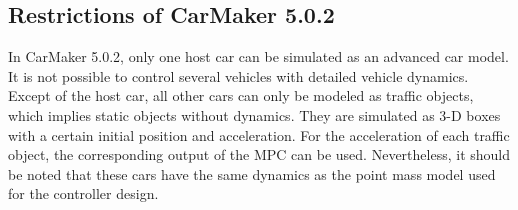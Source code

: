 \documentclass[letterpaper,10pt,conference]{ieeeconf}
\begin{document}
\subsection{Restrictions of CarMaker 5.0.2}

In CarMaker 5.0.2, only one host car can be simulated as an advanced car model. It is not possible to control several vehicles with detailed vehicle dynamics. Except of the host car, all other cars can only be modeled as traffic objects, which implies static objects without dynamics. They are simulated as 3-D boxes with a certain initial position and acceleration. For the acceleration of each traffic object, the corresponding output of the MPC can be used. Nevertheless, it should be noted that these cars have the same dynamics as the point mass model used for the controller design.

\end{document}
